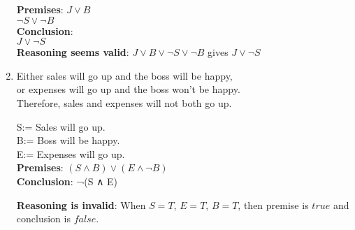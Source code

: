 \begin{solution}
\begin{enumerate}
                \textbf{Premises}:
                $J \vee B$ \\
                $\neg S \vee \neg B$ \\
                
                \textbf{Conclusion}: \\
                $J \vee \neg S$\\
                
                \textbf{Reasoning seems valid}: $J \vee B \vee \neg S \vee \neg B$ gives $J \vee \neg S$
                
        \item
                Either sales will go up and the boss will be happy, \\
                or expenses will go up and the boss won’t be happy.\\
                Therefore, sales and expenses will not both go up.
                
                S:= Sales will go up. \\
                B:= Boss will be happy. \\
                E:= Expenses will go up. \\
                
                \textbf{Premises}:
                $(S \wedge B) \vee (E \wedge \neg B)$ \\
                
                \textbf{Conclusion}:
                ¬(S ∧ E)
                
                \textbf{Reasoning is invalid}: When $S = T$, $E = T$, $B = T$, then premise is $true$ and conclusion is $false$.

        
    \end{enumerate}
\end{solution}